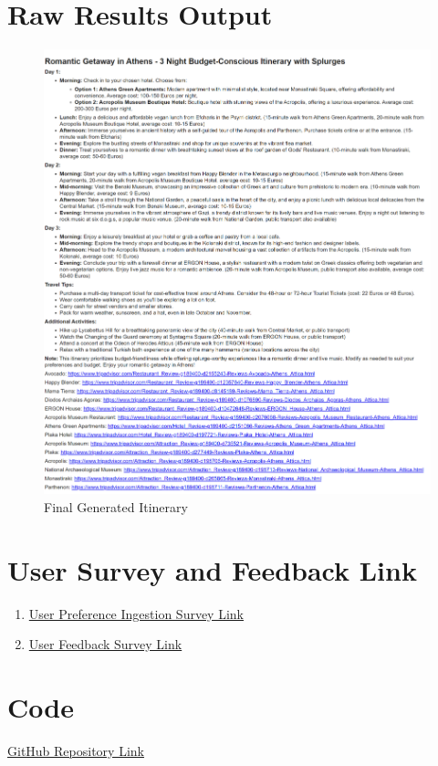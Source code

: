 \documentclass[12pt,a4paper]{report}
\begin{document}
\chapter{Raw Results Output}

\begin{figure}[H]
    \centering
    \includegraphics[scale=.8]{finalitinerary}
    \caption{Final Generated Itinerary}
\end{figure}

\chapter{User Survey and Feedback Link}
\begin{enumerate}
\item{\href{https://forms.gle/BpDPoJoUeJ78FSmy7}{User Preference Ingestion Survey Link}}
\item{\href{https://forms.gle/YWLpgBsJyaWhmze57}{User Feedback Survey Link}}
\end{enumerate}



\chapter{Code}

\href{https://gitfront.io/r/am0445/mkaiLCvJ9XdS/Travel-Itinerary-Generation/}{GitHub Repository Link}
\end{document}
